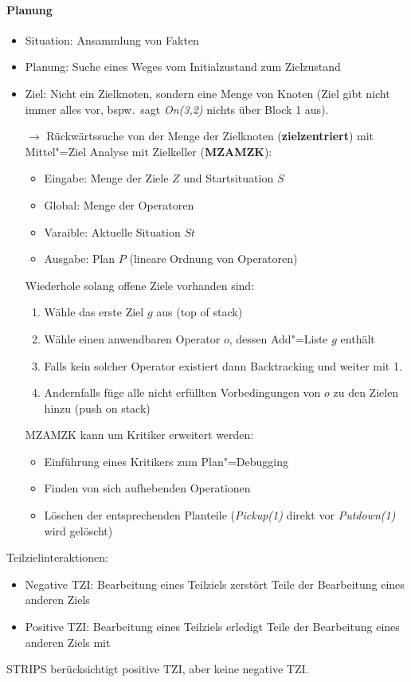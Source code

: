 \paragraph{Planung}
\begin{itemize}
	\item Situation: Ansammlung von Fakten
	\item Planung: Suche eines Weges vom Initialzustand zum Zielzustand
	\item Ziel: Nicht ein Zielknoten, sondern eine Menge von Knoten (Ziel gibt nicht immer alles vor, bspw.\ sagt \emph{On(3,2)} nichts über Block 1 aus).
	\item [$\rightarrow$] Rückwärtssuche von der Menge der Zielknoten (\textbf{zielzentriert}) mit Mittel"=Ziel Analyse mit Zielkeller (\textbf{MZAMZK}):
	\begin{itemize}
		\item Eingabe: Menge der Ziele $Z$ und Startsituation $S$
		\item Global: Menge der Operatoren
		\item Varaible: Aktuelle Situation $St$
		\item Ausgabe: Plan $P$ (lineare Ordnung von Operatoren)
	\end{itemize}
	Wiederhole solang offene Ziele vorhanden sind:
	\begin{enumerate}
		 \item Wähle das erste Ziel $g$ aus (top of stack)
		 \item Wähle einen anwendbaren Operator $o$, dessen Add"=Liste $g$ enthält
		 \item Falls kein solcher Operator existiert dann Backtracking und weiter mit 1.
		 \item Andernfalls füge alle nicht erfüllten Vorbedingungen von $o$ zu den Zielen hinzu (push on stack)
	\end{enumerate}
	MZAMZK kann um Kritiker erweitert werden:
	\begin{itemize}
		\item Einführung eines Kritikers zum Plan"=Debugging
		\item Finden von sich aufhebenden Operationen
		\item Löschen der entsprechenden Planteile (\emph{Pickup(1)} direkt vor \emph{Putdown(1)} wird gelöscht)
	\end{itemize}
\end{itemize}

Teilzielinteraktionen:
\begin{itemize}
	\item Negative TZI: Bearbeitung eines Teilziels zerstört Teile der Bearbeitung eines anderen Ziels
	\item Positive TZI: Bearbeitung eines Teilziels erledigt Teile der Bearbeitung eines anderen Ziels mit
\end{itemize}
STRIPS berücksichtigt positive TZI, aber keine negative TZI.\\

